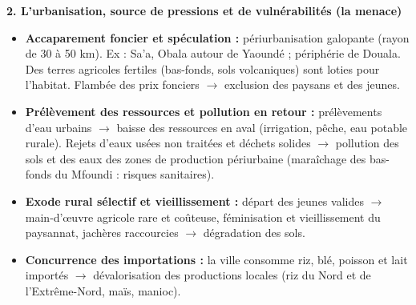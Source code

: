 \documentclass[11pt]{article}
\begin{document}
\begin{exoresolu}
\textbf{2. L'urbanisation, source de pressions et de vulnérabilités (la menace)}
\begin{itemize}
    \item \textbf{Accaparement foncier et spéculation :} périurbanisation galopante (rayon de 30 à 50 km). Ex : Sa'a, Obala autour de Yaoundé ; périphérie de Douala. Des terres agricoles fertiles (bas-fonds, sols volcaniques) sont loties pour l'habitat. Flambée des prix fonciers $\rightarrow$ exclusion des paysans et des jeunes.
    \item \textbf{Prélèvement des ressources et pollution en retour :} prélèvements d'eau urbains $\rightarrow$ baisse des ressources en aval (irrigation, pêche, eau potable rurale). Rejets d'eaux usées non traitées et déchets solides $\rightarrow$ pollution des sols et des eaux des zones de production périurbaine (maraîchage des bas-fonds du Mfoundi : risques sanitaires).
    \item \textbf{Exode rural sélectif et vieillissement :} départ des jeunes valides $\rightarrow$ main-d'œuvre agricole rare et coûteuse, féminisation et vieillissement du paysannat, jachères raccourcies $\rightarrow$ dégradation des sols.
    \item \textbf{Concurrence des importations :} la ville consomme riz, blé, poisson et lait importés $\rightarrow$ dévalorisation des productions locales (riz du Nord et de l'Extrême-Nord, maïs, manioc).
\end{itemize}


\end{exoresolu}
\end{document}
